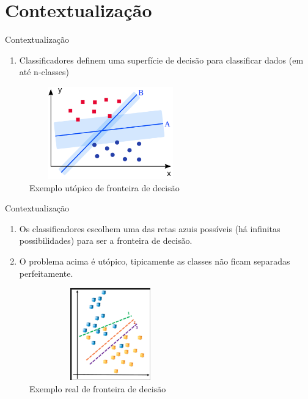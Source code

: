 \section{Contextualização}

\begin{frame}
	\begin{block}{Contextualização}
		\begin{enumerate}
			\item Classificadores definem uma superfície de decisão para classificar dados (em até n-classes)
		\end{enumerate}
		\begin{figure}[!htb]
			\centering	  				
			\includegraphics[height=4cm, width = 7cm]{./pic/fronteirautopia.png}
			\caption{Exemplo utópico de fronteira de decisão}
			\label{fig_ds_process}
		\end{figure}	
	\end{block}
\end{frame}

\begin{frame}
	\begin{block}{Contextualização}
		\begin{enumerate}
			\item Os classificadores escolhem uma das retas azuis possíveis (há infinitas possibilidades) para ser a fronteira de decisão.
			\item O problema acima é utópico, tipicamente as classes não ficam separadas perfeitamente.
		\end{enumerate}
			\begin{figure}[!htb]
			\centering	  				
			\includegraphics[height=4cm, width = 7cm]{./pic/fronteirareal.png}
			\caption{Exemplo real de fronteira de decisão}
			\label{fig_ds_process}
		\end{figure}	
	\end{block}
\end{frame}

